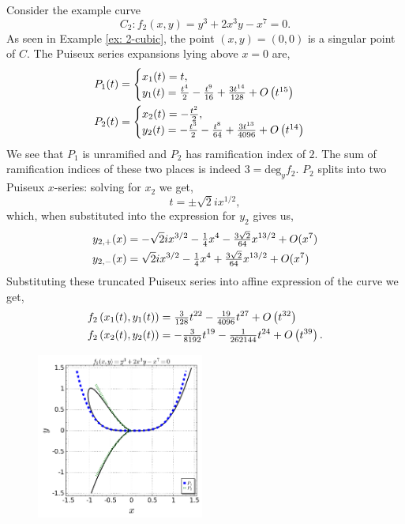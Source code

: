 \begin{example} \label{ex:f2-puiseux} Consider the example curve
  \[
    C_2 : f_2(x,y) = y^3 + 2x^3y - x^7 = 0.
  \]
  As seen in Example \ref{ex: 2-cubic}, the point $(x,y) = (0,0)$ is a singular
  point of $C$. The Puiseux series expansions lying above $x=0$ are,
  \begin{align} \label{eq:f2-puiseux-series-expansions}
    P_1(t) &= \begin{cases}
        x_1(t) = t, \\
        y_1(t) = \frac{t^{4}}{2} - \frac{t^{9}}{16} + \frac{3 t^{14}}{128} + O\left(t^{15}\right)
      \end{cases} \notag \\
    P_2(t) &= \begin{cases}
      x_2(t) = - \frac{t^{2}}{2}, \\
      y_2(t) =  - \frac{t^{3}}{2} - \frac{t^{8}}{64} + \frac{3 t^{13}}{4096} + O\left(t^{14}\right)
    \end{cases}
  \end{align}
  We see that $P_1$ is unramified and $P_2$ has ramification index of $2$. The
  sum of ramification indices of these two places is indeed $3 = \text{deg}_y
  f_2$. $P_2$ splits into two Puiseux $x$-series: solving for $x_2$ we get,
  \begin{equation}
    t = \pm \sqrt{2}i x^{1/2},
  \end{equation}
  which, when substituted into the expression for $y_2$ gives us,
  \begin{align}
    y_{2,+}(x) &= -\sqrt{2}ix^{3/2} - \tfrac{1}{4} x^4 - \tfrac{3\sqrt{2}}{64}x^{13/2} + O(x^{7}) \notag \\
    y_{2,-}(x) &= \sqrt{2}ix^{3/2} - \tfrac{1}{4} x^4 + \tfrac{3\sqrt{2}}{64}x^{13/2} + O(x^{7})
  \end{align}
  Substituting these truncated Puiseux series into affine expression of the
  curve we get,
  \begin{align}
    f_2\left(x_1(t), y_1(t)\right)
    &=
    \tfrac{3}{128}t^{22} - \tfrac{19}{4096}t^{27} + O\left(t^{32}\right) \notag \\
    f_2\left(x_2(t), y_2(t)\right)
    &=
      -\tfrac{3}{8192}t^{19} - \tfrac{1}{262144}t^{24} + O\left(t^{39}\right).
  \end{align}
  \begin{figure}
  \centering
  \includegraphics[width=0.49\textwidth]{images/f2-puiseux.png}

\end{figure}
\end{example}
